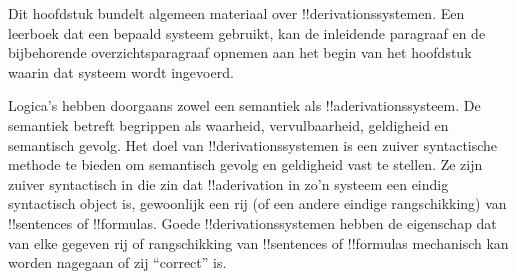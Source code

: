 \documentclass[openany]{memoir}
\begin{document}
\begingroup
\def\olfilename{OLP-0063}
\def\olfilepath{content/first-order-logic/proof-systems/}
\hypertarget{unit-OLP-0063}{}



      {}
      {}

\begin{editorial}
Dit hoofdstuk bundelt algemeen materiaal over !!{derivation}ssystemen.
Een leerboek dat een bepaald systeem gebruikt, kan de inleidende paragraaf
en de bijbehorende overzichtsparagraaf opnemen aan het begin van het
hoofdstuk waarin dat systeem wordt ingevoerd.
\end{editorial}
\endgroup

\begingroup
\def\olfilename{OLP-0064}
\def\olfilepath{content/first-order-logic/proof-systems/}
\hypertarget{unit-OLP-0064}{}



      {}
      {}


Logica's hebben doorgaans zowel een semantiek als
!!a{derivation}ssysteem. De semantiek betreft begrippen als waarheid,
vervulbaarheid, geldigheid en semantisch gevolg. Het doel van
!!{derivation}ssystemen is een zuiver syntactische methode te bieden
om semantisch gevolg en geldigheid vast te stellen. Ze zijn zuiver
syntactisch in die zin dat !!a{derivation} in zo'n systeem een eindig
syntactisch object is, gewoonlijk een rij (of een andere eindige
rangschikking) van !!{sentence}s of !!{formula}s. Goede
!!{derivation}ssystemen hebben de eigenschap dat van elke gegeven rij
of rangschikking van !!{sentence}s of !!{formula}s mechanisch kan
worden nagegaan of zij ``correct'' is.
\end{document}
